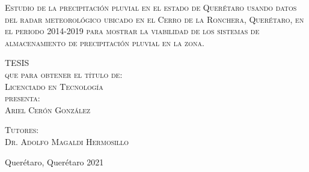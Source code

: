\documentclass[letterpaper,12pt,oneside]{book}
\begin{document}
\begin{titlepage}
\begin{minipage}[c][0.81\textheight][t]{0.75\textwidth}
\begin{center}
                {\large\scshape Estudio de la precipitación pluvial en el estado de Querétaro usando datos del radar meteorológico ubicado en el Cerro de la Ronchera, Querétaro, en el periodo 2014-2019 para mostrar la viabilidad de los sistemas de almacenamiento de precipitación pluvial en la zona.}\\[.2in]

                \vspace{2cm}            

                \textsc{\LARGE T\hspace{1.5cm}E\hspace{1.5cm}S\hspace{1.5cm}I\hspace{1.5cm}S}\\[0.5cm]
                \textsc{\large que para obtener el t\'itulo de:}\\[0.5cm]
                \textsc{\large Licenciado en Tecnología}\\[0.5cm]
                \textsc{\large presenta:}\\[0.5cm]
                \textsc{\large {Ariel Cerón González}}\\[2cm]          

                \vspace{0.5cm}

                {\large\scshape Tutores:\\[0.3cm] {Dr. Adolfo Magaldi Hermosillo}}\\[.2in]

                \vspace{0.5cm}

                \large{Querétaro, Querétaro}{ }{2021}
            \end{center}
        \end{minipage}
    \end{titlepage}



\frontmatter
\end{document}
